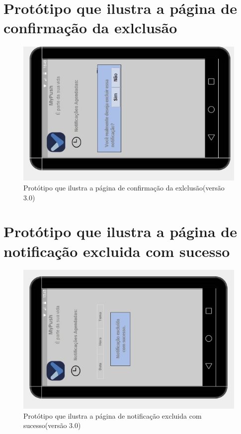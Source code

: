 \begin{apendicesenv}
      \section*{Protótipo que ilustra a página de confirmação da exlclusão}

    \begin{figure}[!htbp]
      \centering
      \includegraphics[scale=0.5, angle=-90]{editaveis/figuras/prototipo_alta_fidelidade_v3/3_11}
      \caption{Protótipo que ilustra a página de confirmação da exlclusão(versão 3.0)}
      \label{v3}
    \end{figure}
    
      \section*{Protótipo que ilustra a página de notificação excluida com sucesso}

    \begin{figure}[!htbp]
      \centering
      \includegraphics[scale=0.5, angle=-90]{editaveis/figuras/prototipo_alta_fidelidade_v3/3_12}
      \caption{Protótipo que ilustra a página de notificação excluida com sucesso(versão 3.0)}
      \label{v3}
    \end{figure}
    

\end{apendicesenv}
